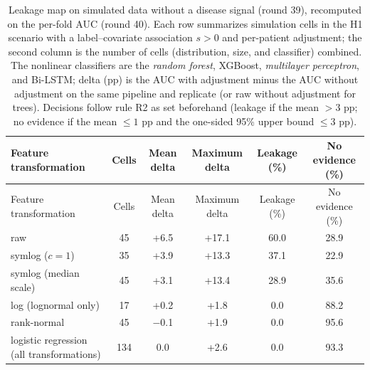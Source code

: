 {\scriptsize
\setlength{\tabcolsep}{2pt}
\begin{longtable}{p{}ccccc}
\caption{Leakage map on simulated data without a disease signal (round 39), recomputed on the per-fold AUC (round 40). Each row summarizes simulation cells in the H1 scenario with a label--covariate association $s>0$ and per-patient adjustment; the second column is the number of cells (distribution, size, and classifier) combined. The nonlinear classifiers are the \textit{random forest}, XGBoost, \textit{multilayer perceptron}, and Bi-LSTM; delta (pp) is the AUC with adjustment minus the AUC without adjustment on the same pipeline and replicate (or raw without adjustment for trees). Decisions follow rule R2 as set beforehand (leakage if the mean $>3$ pp; no evidence if the mean $\leq 1$ pp and the one-sided 95\% upper bound $\leq 3$ pp).}\label{tab:peta_sim}\\
\toprule
Feature transformation & Cells & Mean delta & Maximum delta & Leakage (\%) & No evidence (\%) \\
\midrule
\endfirsthead
\toprule
Feature transformation & Cells & Mean delta & Maximum delta & Leakage (\%) & No evidence (\%) \\
\midrule
\endhead
\bottomrule
\endfoot
raw & 45 & +6.5 & +17.1 & 60.0 & 28.9 \\
symlog ($c=1$) & 35 & +3.9 & +13.3 & 37.1 & 22.9 \\
symlog (median scale) & 45 & +3.1 & +13.4 & 28.9 & 35.6 \\
log (lognormal only) & 17 & +0.2 & +1.8 & 0.0 & 88.2 \\
rank-normal & 45 & $-$0.1 & +1.9 & 0.0 & 95.6 \\
logistic regression (all transformations) & 134 & 0.0 & +2.6 & 0.0 & 93.3 \\
\end{longtable}
}
